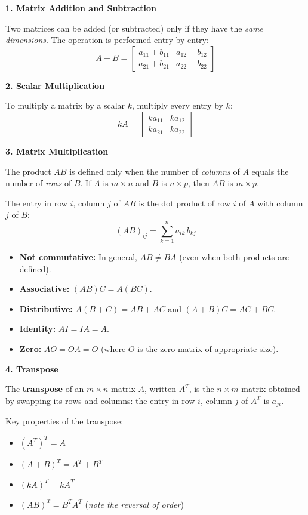 \textbf{1. Matrix Addition and Subtraction}

Two matrices can be added (or subtracted) only if they have the \emph{same dimensions}. The operation is performed entry by entry:
\[
A + B = \begin{bmatrix} a_{11}+b_{11} & a_{12}+b_{12} \\ a_{21}+b_{21} & a_{22}+b_{22} \end{bmatrix}
\]

\textbf{2. Scalar Multiplication}

To multiply a matrix by a scalar $k$, multiply every entry by $k$:
\[
kA = \begin{bmatrix} ka_{11} & ka_{12} \\ ka_{21} & ka_{22} \end{bmatrix}
\]

\textbf{3. Matrix Multiplication}

The product $AB$ is defined only when the number of \emph{columns} of $A$ equals the number of \emph{rows} of $B$. If $A$ is $m \times n$ and $B$ is $n \times p$, then $AB$ is $m \times p$.

The entry in row $i$, column $j$ of $AB$ is the dot product of row $i$ of $A$ with column $j$ of $B$:
\[
(AB)_{ij} = \sum_{k=1}^{n} a_{ik}\, b_{kj}
\]

\begin{remark}
\begin{itemize}[leftmargin=*]
  \item \textbf{Not commutative:} In general, $AB \neq BA$ (even when both products are defined).
  \item \textbf{Associative:} $(AB)C = A(BC)$.
  \item \textbf{Distributive:} $A(B+C) = AB + AC$ and $(A+B)C = AC + BC$.
  \item \textbf{Identity:} $AI = IA = A$.
  \item \textbf{Zero:} $AO = OA = O$ (where $O$ is the zero matrix of appropriate size).
\end{itemize}
\end{remark}

\textbf{4. Transpose}

The \textbf{transpose} of an $m \times n$ matrix $A$, written $A^T$, is the $n \times m$ matrix obtained by swapping its rows and columns: the entry in row $i$, column $j$ of $A^T$ is $a_{ji}$.

Key properties of the transpose:
\begin{itemize}[leftmargin=*]
  \item $(A^T)^T = A$
  \item $(A + B)^T = A^T + B^T$
  \item $(kA)^T = kA^T$
  \item $(AB)^T = B^T A^T$ \quad (\emph{note the reversal of order})
\end{itemize}

